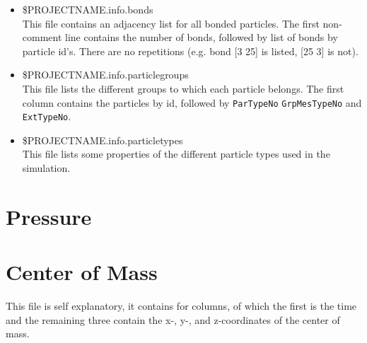 \begin{itemize}
\item \$PROJECTNAME.info.bonds \\
  This file contains an adjacency list for all bonded particles. The first non-comment line contains the number of bonds, followed
by list of bonds by particle id's. There are no repetitions (e.g. bond [3 25] is listed, [25 3] is not).
\item \$PROJECTNAME.info.particlegroups\\
  This file lists the different groups to which each particle belongs. The first column contains the particles by id, followed by {\tt ParTypeNo} {\tt GrpMesTypeNo} and {\tt ExtTypeNo}.
\item \$PROJECTNAME.info.particletypes \\
  This file lists some properties of the different particle types used in the simulation. 
\end{itemize}


\section{Pressure}

\section{Center of Mass}
This file is self explanatory, it contains for columns, of which the first is the time and the remaining three contain the x-, y-, and z-coordinates of the center of mass.
